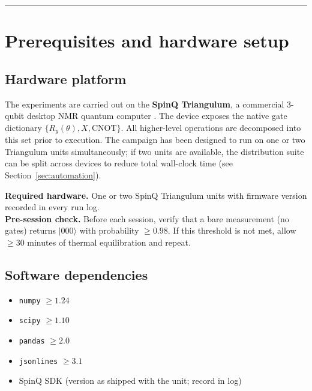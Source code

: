 \documentclass[11pt,a4paper]{article}
\newcommand{\Ry}{R_y}
\renewcommand{\ket}[1]{|#1\rangle}
\begin{document}
\tableofcontents

\bigskip\hrule\bigskip

\section{Prerequisites and hardware setup}
\label{sec:prerequisites}

\subsection{Hardware platform}

The experiments are carried out on the \textbf{SpinQ Triangulum},
a commercial 3-qubit desktop NMR quantum computer \cite{FengEtAl2022}.
The device exposes the native gate dictionary
$\{\Ry(\theta), X, \mathrm{CNOT}\}$.
All higher-level operations are decomposed into this set prior to
execution. The campaign has been designed to run on one or two
Triangulum units simultaneously; if two units are available, the
distribution suite can be split across devices to reduce total
wall-clock time (see Section~\ref{sec:automation}).

\begin{protocolbox}
\textbf{Required hardware.}
One or two SpinQ Triangulum units with firmware version recorded
in every run log.\\[4pt]
\textbf{Pre-session check.}
Before each session, verify that a bare measurement (no gates)
returns $\ket{000}$ with probability $\geq 0.98$.
If this threshold is not met, allow $\geq 30$ minutes of thermal
equilibration and repeat.
\end{protocolbox}

\subsection{Software dependencies}

\begin{itemize}
  \item \texttt{numpy} $\geq 1.24$
  \item \texttt{scipy} $\geq 1.10$
  \item \texttt{pandas} $\geq 2.0$
  \item \texttt{jsonlines} $\geq 3.1$
  \item SpinQ SDK (version as shipped with the unit; record in log)
\end{itemize}
\end{document}
